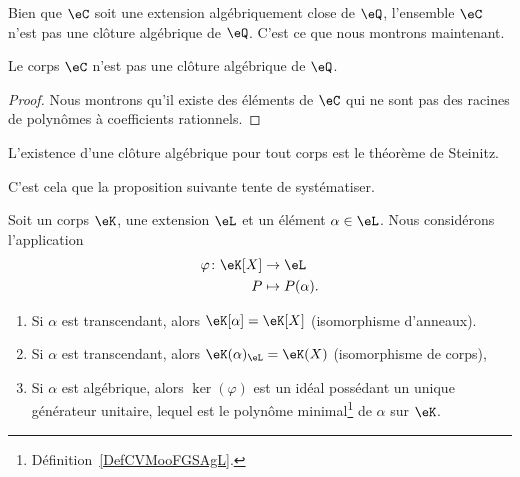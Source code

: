 Bien que \( \eC\) soit une extension algébriquement close de \( \eQ\), l'ensemble \( \eC\) n'est pas une clôture algébrique de \( \eQ\). C'est ce que nous montrons maintenant.
\begin{lemma}       \label{LEMooRDIZooRjWNMa}
    Le corps \( \eC\) n'est pas une clôture algébrique de \( \eQ\).    
\end{lemma}

\begin{proof}
    Nous montrons qu'il existe des éléments de \( \eC\) qui ne sont pas des racines de polynômes à coefficients rationnels.
\end{proof}

L'existence d'une clôture algébrique pour tout corps est le théorème de Steinitz.


C'est cela que la proposition suivante tente de systématiser.
\begin{proposition}     \label{PROPooSYQWooFbfQtm}
    Soit un corps \( \eK\), une extension \( \eL\) et un élément \( \alpha\in \eL\). Nous considérons l'application
    \begin{equation}
        \begin{aligned}
            \varphi\colon \eK[X]&\to \eL \\
            P&\mapsto P(\alpha).
        \end{aligned}
    \end{equation}
    \begin{enumerate}
        \item       \label{ITEMooUZDQooOasiRQ}
            Si \( \alpha\) est transcendant, alors \( \eK[\alpha]=\eK[X]\) (isomorphisme d'anneaux).
        \item
            Si \( \alpha\) est transcendant, alors \( \eK(\alpha)_{\eL}=\eK(X)\) (isomorphisme de corps),
        \item
            Si \( \alpha\) est algébrique, alors \( \ker(\varphi)\) est un idéal possédant un unique générateur unitaire, lequel est le polynôme minimal\footnote{Définition~\ref{DefCVMooFGSAgL}.} de \( \alpha\) sur \( \eK\).
    \end{enumerate}
\end{proposition}

